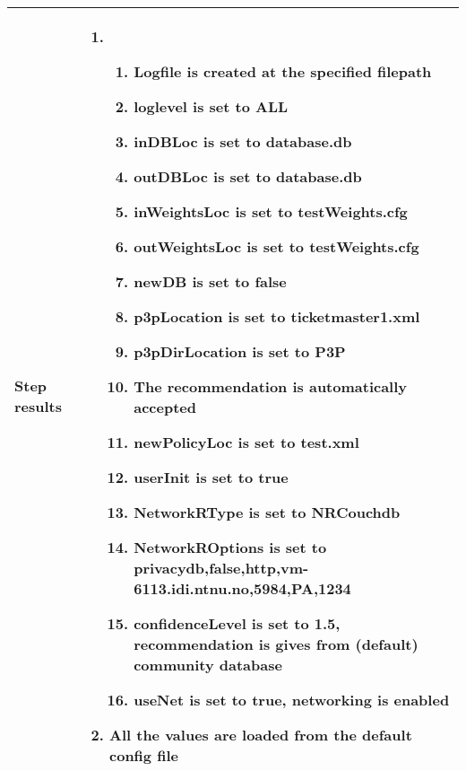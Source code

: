 \documentclass[a4paper]{article}
\begin{document}
\begin{center}
\begin{tabular}{ |  p{3cm} | p{7cm} | }
			Step results & 	\begin{enumerate}
							\item
							\begin{enumerate}
								\item Logfile is created at the specified filepath
								\item loglevel is set to ALL
								\item inDBLoc is set to database.db
								\item outDBLoc is set to database.db
								\item inWeightsLoc is set to testWeights.cfg
								\item outWeightsLoc is set to testWeights.cfg
								\item newDB is set to false
								\item p3pLocation is set to ticketmaster1.xml
								\item p3pDirLocation is set to P3P
								\item The recommendation is automatically accepted
								\item newPolicyLoc is set to test.xml
								\item userInit is set to true
								\item NetworkRType is set to NRCouchdb
								\item NetworkROptions is set to privacydb,false,http,vm-6113.idi.ntnu.no,5984,PA,1234
								\item confidenceLevel is set to 1.5, recommendation is gives from (default) community database
								\item useNet is set to true, networking is enabled
							\end{enumerate}
							\item All the values are loaded from the default config file
						\end{enumerate} \\ [5pt] \hline


\end{tabular}
\end{center}
\end{document}
